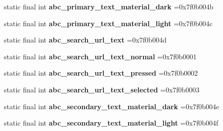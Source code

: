 \begin{DoxyCompactItemize}
\item 
\hypertarget{classcheck_1_1test_1_1_r_1_1color_a4b0de3aeebb9a2a38da46e57f35bc5ac}{}static final int {\bfseries abc\+\_\+primary\+\_\+text\+\_\+material\+\_\+dark} =0x7f0b004b\label{classcheck_1_1test_1_1_r_1_1color_a4b0de3aeebb9a2a38da46e57f35bc5ac}

\item 
\hypertarget{classcheck_1_1test_1_1_r_1_1color_a4ddec4ae3b9966dcf31bf72ca1472851}{}static final int {\bfseries abc\+\_\+primary\+\_\+text\+\_\+material\+\_\+light} =0x7f0b004c\label{classcheck_1_1test_1_1_r_1_1color_a4ddec4ae3b9966dcf31bf72ca1472851}

\item 
\hypertarget{classcheck_1_1test_1_1_r_1_1color_a84e5b3f79724143e761a7cd3d8171b31}{}static final int {\bfseries abc\+\_\+search\+\_\+url\+\_\+text} =0x7f0b004d\label{classcheck_1_1test_1_1_r_1_1color_a84e5b3f79724143e761a7cd3d8171b31}

\item 
\hypertarget{classcheck_1_1test_1_1_r_1_1color_a72559d8ea285a0dc143a0db0e2f58624}{}static final int {\bfseries abc\+\_\+search\+\_\+url\+\_\+text\+\_\+normal} =0x7f0b0001\label{classcheck_1_1test_1_1_r_1_1color_a72559d8ea285a0dc143a0db0e2f58624}

\item 
\hypertarget{classcheck_1_1test_1_1_r_1_1color_ad8bb8d7330eee6730121be6b5b8f1ea7}{}static final int {\bfseries abc\+\_\+search\+\_\+url\+\_\+text\+\_\+pressed} =0x7f0b0002\label{classcheck_1_1test_1_1_r_1_1color_ad8bb8d7330eee6730121be6b5b8f1ea7}

\item 
\hypertarget{classcheck_1_1test_1_1_r_1_1color_ab407ae01e7667bb302710c5d723df1c9}{}static final int {\bfseries abc\+\_\+search\+\_\+url\+\_\+text\+\_\+selected} =0x7f0b0003\label{classcheck_1_1test_1_1_r_1_1color_ab407ae01e7667bb302710c5d723df1c9}

\item 
\hypertarget{classcheck_1_1test_1_1_r_1_1color_a42fac30b675609476a589b157c5dd53d}{}static final int {\bfseries abc\+\_\+secondary\+\_\+text\+\_\+material\+\_\+dark} =0x7f0b004e\label{classcheck_1_1test_1_1_r_1_1color_a42fac30b675609476a589b157c5dd53d}

\item 
\hypertarget{classcheck_1_1test_1_1_r_1_1color_a5efdfb940116364c4238292e71cee6f5}{}static final int {\bfseries abc\+\_\+secondary\+\_\+text\+\_\+material\+\_\+light} =0x7f0b004f\label{classcheck_1_1test_1_1_r_1_1color_a5efdfb940116364c4238292e71cee6f5}


\end{DoxyCompactItemize}
